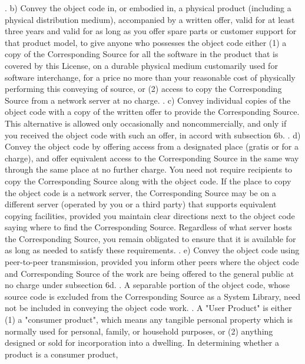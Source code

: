 \begin{script}
 .
     b) Convey the object code in, or embodied in, a physical product
     (including a physical distribution medium), accompanied by a
     written offer, valid for at least three years and valid for as
     long as you offer spare parts or customer support for that product
     model, to give anyone who possesses the object code either (1) a
     copy of the Corresponding Source for all the software in the
     product that is covered by this License, on a durable physical
     medium customarily used for software interchange, for a price no
     more than your reasonable cost of physically performing this
     conveying of source, or (2) access to copy the
     Corresponding Source from a network server at no charge.
 .
     c) Convey individual copies of the object code with a copy of the
     written offer to provide the Corresponding Source.  This
     alternative is allowed only occasionally and noncommercially, and
     only if you received the object code with such an offer, in accord
     with subsection 6b.
 .
     d) Convey the object code by offering access from a designated
     place (gratis or for a charge), and offer equivalent access to the
     Corresponding Source in the same way through the same place at no
     further charge.  You need not require recipients to copy the
     Corresponding Source along with the object code.  If the place to
     copy the object code is a network server, the Corresponding Source
     may be on a different server (operated by you or a third party)
     that supports equivalent copying facilities, provided you maintain
     clear directions next to the object code saying where to find the
     Corresponding Source.  Regardless of what server hosts the
     Corresponding Source, you remain obligated to ensure that it is
     available for as long as needed to satisfy these requirements.
 .
     e) Convey the object code using peer-to-peer transmission, provided
     you inform other peers where the object code and Corresponding
     Source of the work are being offered to the general public at no
     charge under subsection 6d.
 .
   A separable portion of the object code, whose source code is excluded
 from the Corresponding Source as a System Library, need not be
 included in conveying the object code work.
 .
   A "User Product" is either (1) a "consumer product", which means any
 tangible personal property which is normally used for personal, family,
 or household purposes, or (2) anything designed or sold for incorporation
 into a dwelling.  In determining whether a product is a consumer product,

\end{script}
